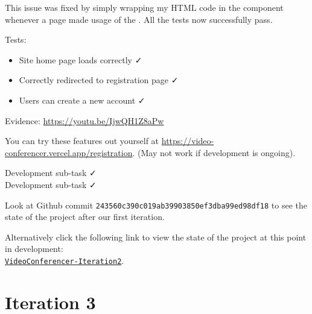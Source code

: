 This issue was fixed by simply wrapping my HTML code in the
 component whenever a page made usage of the
. All the tests now successfully pass. \\ \vspace{0.2cm}

{\color{gray} \hrulefill}
\vspace{0.2cm}

{\sffamily Tests:}
\begin{itemize}
  \item Site home page loads correctly \faCheck \\
  \item Correctly redirected to registration page \faCheck \\
  \item Users can create a new account \faCheck \\
\end{itemize}

{\sffamily Evidence: \url{https://youtu.be/IjwQH1Z8aPw}}

{\color{gray} \hrulefill}
\vspace{0.2cm}

You can try these features out yourself at \url{https://video-conferencer.vercel.app/registration}.
(May not work if development is ongoing).\\ \vspace{0.2cm}

{\sffamily Development sub-task  \faCheck \\ \vspace{0.2cm}
Development sub-task  \faCheck } \\ \vspace{0.2cm}

Look at Github commit \texttt{243560c390c019ab39903850ef3dba99ed98df18} to see the state of the project after our first
iteration. \\ \vspace{0.2cm}

Alternatively click the following link to view the state of
the project at this point in development: \\
\href{https://github.com/zzzNathan/Video-Conferencer/tree/243560c390c019ab39903850ef3dba99ed98df18}{
\texttt{VideoConferencer-Iteration2}}.

\newpage

\section{Iteration 3}

